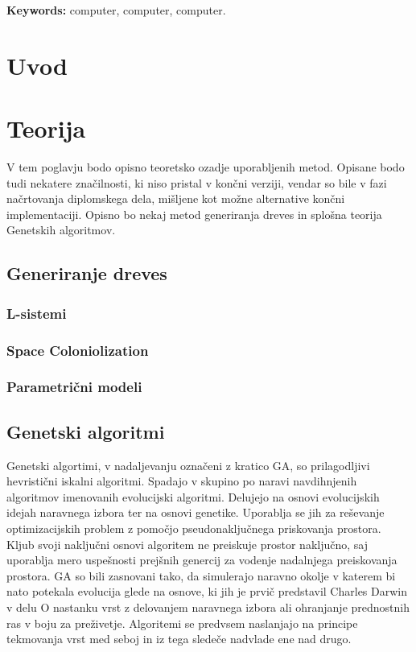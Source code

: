\documentclass[a4paper, 12pt]{book}
\newcommand{\tkeywordsEn}{computer, computer, computer}
\newcommand{\clearemptydoublepage}{\newpage{\pagestyle{empty}\cleardoublepage}}
\begin{document}
\noindent\textbf{Keywords:} \tkeywordsEn.
\clearemptydoublepage

\mainmatter
\setcounter{page}{1}
\pagestyle{fancy}

\chapter{Uvod}
\chapter{Teorija}
V tem poglavju bodo opisno teoretsko ozadje uporabljenih metod. Opisane bodo tudi nekatere značilnosti, ki niso pristal v končni verziji, vendar so bile v fazi načrtovanja diplomskega dela, mišljene kot možne alternative končni implementaciji. Opisno bo nekaj metod generiranja dreves in splošna teorija Genetskih algoritmov.
\section{Generiranje dreves}
\subsection{L-sistemi}
\subsection{Space Coloniolization}
\subsection{Parametrični modeli}
\section{Genetski algoritmi}
Genetski algortimi, v nadaljevanju označeni z kratico GA, so prilagodljivi hevristični iskalni algoritmi. Spadajo v skupino po naravi navdihnjenih algoritmov imenovanih evolucijski algoritmi. Delujejo na osnovi evolucijskih idejah naravnega izbora ter na osnovi genetike. Uporablja se jih za reševanje optimizacijskih problem z pomočjo pseudonaključnega priskovanja prostora. Kljub svoji naključni osnovi algoritem ne preiskuje prostor naključno, saj uporablja mero uspešnosti prejšnih genercij za vodenje nadalnjega preiskovanja prostora. GA so bili zasnovani tako, da simulerajo naravno okolje v katerem bi nato potekala evolucija glede na osnove, ki jih je prvič predstavil Charles Darwin v delu O nastanku vrst z delovanjem naravnega izbora ali ohranjanje prednostnih ras v boju za preživetje. Algoritemi se predvsem naslanjajo na principe tekmovanja vrst med seboj in iz tega sledeče nadvlade ene nad drugo.\\
\end{document}
